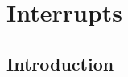 \chapter{Interrupts}\label{avr-interrupts}

\section{Introduction}\label{avr-interrupts-introduction}
